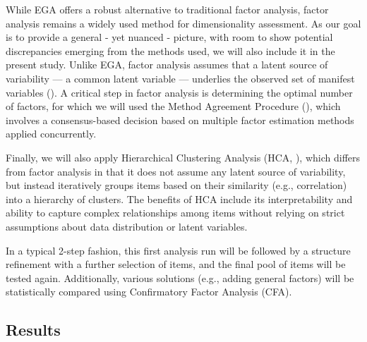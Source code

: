 \documentclass[
  jou,
  floatsintext,
  longtable,
  nolmodern,
  notxfonts,
  notimes,
  colorlinks=true,linkcolor=blue,citecolor=blue,urlcolor=blue]{apa7}
\begin{document}
While EGA offers a robust alternative to traditional factor analysis,
factor analysis remains a widely used method for dimensionality
assessment. As our goal is to provide a general - yet nuanced - picture,
with room to show potential discrepancies emerging from the methods
used, we will also include it in the present study. Unlike EGA, factor
analysis assumes that a latent source of variability --- a common latent
variable --- underlies the observed set of manifest variables
(). A
critical step in factor analysis is determining the optimal number of
factors, for which we will used the Method Agreement Procedure
(), which
involves a consensus-based decision based on multiple factor estimation
methods applied concurrently.

Finally, we will also apply Hierarchical Clustering Analysis (HCA,
), which
differs from factor analysis in that it does not assume any latent
source of variability, but instead iteratively groups items based on
their similarity (e.g., correlation) into a hierarchy of clusters. The
benefits of HCA include its interpretability and ability to capture
complex relationships among items without relying on strict assumptions
about data distribution or latent variables.

In a typical 2-step fashion, this first analysis run will be followed by
a structure refinement with a further selection of items, and the final
pool of items will be tested again. Additionally, various solutions
(e.g., adding general factors) will be statistically compared using
Confirmatory Factor Analysis (CFA).

\subsection{Results}\label{results}
\end{document}
